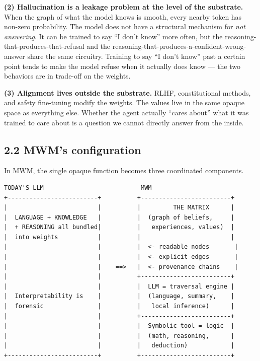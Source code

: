 \documentclass[12pt]{article}
\begin{document}
\textbf{(2) Hallucination is a leakage problem at the level of the substrate.} When the graph of what the model knows is smooth, every nearby token has non-zero probability. The model does not have a structural mechanism for \emph{not answering}. It can be trained to say ``I don't know'' more often, but the reasoning-that-produces-that-refusal and the reasoning-that-produces-a-confident-wrong-answer share the same circuitry. Training to say ``I don't know'' past a certain point tends to make the model refuse when it actually does know --- the two behaviors are in trade-off on the weights.

\textbf{(3) Alignment lives outside the substrate.} RLHF, constitutional methods, and safety fine-tuning modify the weights. The values live in the same opaque space as everything else. Whether the agent actually ``cares about'' what it was trained to care about is a question we cannot directly answer from the inside.

\subsection{2.2 MWM's configuration}\label{mwms-configuration}

In MWM, the single opaque function becomes three coordinated components.

\begin{verbatim}
TODAY'S LLM                           MWM
+-------------------------+          +-------------------------+
|                         |          |         THE MATRIX      |
|  LANGUAGE + KNOWLEDGE   |          |  (graph of beliefs,     |
|  + REASONING all bundled|          |   experiences, values)  |
|  into weights           |          |                         |
|                         |          |  <- readable nodes       |
|                         |          |  <- explicit edges       |
|                         |    ==>   |  <- provenance chains    |
|                         |          +-------------------------+
|                         |          |  LLM = traversal engine |
|  Interpretability is    |          |  (language, summary,    |
|  forensic               |          |   local inference)      |
|                         |          +-------------------------+
|                         |          |  Symbolic tool = logic  |
|                         |          |  (math, reasoning,      |
|                         |          |   deduction)            |
+-------------------------+          +-------------------------+
\end{verbatim}
\end{document}
